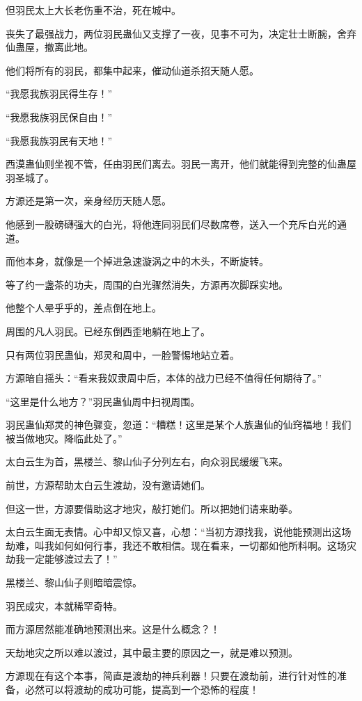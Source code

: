 \begin{this_body}
但羽民太上大长老伤重不治，死在城中。

丧失了最强战力，两位羽民蛊仙又支撑了一夜，见事不可为，决定壮士断腕，舍弃仙蛊屋，撤离此地。

他们将所有的羽民，都集中起来，催动仙道杀招天随人愿。

“我愿我族羽民得生存！”

“我愿我族羽民保自由！”

“我愿我族羽民有天地！”

西漠蛊仙则坐视不管，任由羽民们离去。羽民一离开，他们就能得到完整的仙蛊屋羽圣城了。

方源还是第一次，亲身经历天随人愿。

他感到一股磅礴强大的白光，将他连同羽民们尽数席卷，送入一个充斥白光的通道。

而他本身，就像是一个掉进急速漩涡之中的木头，不断旋转。

等了约一盏茶的功夫，周围的白光骤然消失，方源再次脚踩实地。

他整个人晕乎乎的，差点倒在地上。

周围的凡人羽民。已经东倒西歪地躺在地上了。

只有两位羽民蛊仙，郑灵和周中，一脸警惕地站立着。

方源暗自摇头：“看来我奴隶周中后，本体的战力已经不值得任何期待了。”

“这里是什么地方？”羽民蛊仙周中扫视周围。

羽民蛊仙郑灵的神色骤变，忽道：“糟糕！这里是某个人族蛊仙的仙窍福地！我们被当做地灾。降临此处了。”

太白云生为首，黑楼兰、黎山仙子分列左右，向众羽民缓缓飞来。

前世，方源帮助太白云生渡劫，没有邀请她们。

但这一世，方源要借助这才地灾，敲打她们。所以把她们请来助拳。

太白云生面无表情。心中却又惊又喜，心想：“当初方源找我，说他能预测出这场劫难，叫我如何如何行事，我还不敢相信。现在看来，一切都如他所料啊。这场灾劫我一定能够渡过去了！”

黑楼兰、黎山仙子则暗暗震惊。

羽民成灾，本就稀罕奇特。

而方源居然能准确地预测出来。这是什么概念？！

天劫地灾之所以难以渡过，其中最主要的原因之一，就是难以预测。

方源现在有这个本事，简直是渡劫的神兵利器！只要在渡劫前，进行针对性的准备，必然可以将渡劫的成功可能，提高到一个恐怖的程度！


\end{this_body}
